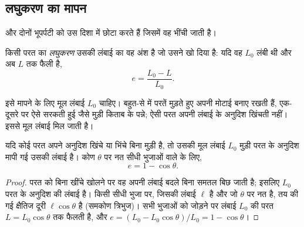\subsection{लघुकरण का मापन}

 और  दोनों भूपर्पटी को उस दिशा में छोटा करते हैं जिसमें वह
भींची जाती है।

\begin{definition}[लघुकरण]\label{def:g12:mountain-building:shortening}
किसी परत का \emph{लघुकरण} उसकी लंबाई का वह अंश है जो
उसने खो दिया है: यदि वह $L_0$ लंबी थी और अब $L$ तक फैली है,
\[
  e = \frac{L_0 - L}{L_0}.
\]
\end{definition}

इसे मापने के लिए मूल लंबाई $L_0$ चाहिए। बहुत-से  में
परतें मुड़ते हुए अपनी मोटाई बनाए रखती हैं, एक-दूसरे पर ऐसे सरकती हुई जैसे
मुड़ी किताब के पन्ने; ऐसी परत अपनी लंबाई के अनुदिश खिंचती नहीं। इससे
मूल लंबाई मिल जाती है।

\begin{proposition}\label{prop:g12:mountain-building:shortening}
यदि कोई परत अपने अनुदिश खिंचे या भिंचे बिना मुड़ी है, तो
उसकी मूल लंबाई $L_0$ मुड़ी परत के अनुदिश मापी गई उसकी लंबाई है।
कोण $\theta$ पर नत सीधी भुजाओं वाले  के लिए,
\[
  e = 1 - \cos\theta .
\]
\end{proposition}

\begin{proof}
परत को बिना खींचे खोलने पर वह अपनी लंबाई बदले बिना समतल
बिछ जाती है; इसलिए $L_0$ परत के अनुदिश की लंबाई है। किसी सीधी भुजा पर,
जिसकी लंबाई $\ell$ है और जो $\theta$ पर नत है, तय की गई
क्षैतिज दूरी $\ell\cos\theta$ है (समकोण त्रिभुज)। सभी भुजाओं को जोड़ने पर
लंबाई $L_0$ की परत $L = L_0\cos\theta$ तक फैलती है, और $e = (L_0 - L_0\cos\theta)/L_0 =
1 - \cos\theta$।
\end{proof}

